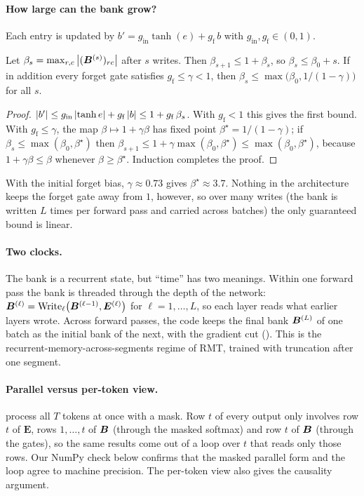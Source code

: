 \paragraph{How large can the bank grow?} Each entry is updated by
$b' = g_{\mathrm{in}}\tanh(e) + g_{\mathrm{f}}\, b$ with $g_{\mathrm{in}}, g_{\mathrm{f}} \in (0,1)$.
\begin{proposition}\label{prop:c10-lm2-bound}
Let $\beta_s = \max_{r,c} \left\lvert (\bm{B}^{(s)})_{rc}\right\rvert$ after $s$ writes. Then $\beta_{s+1} \le 1 +
\beta_s$, so $\beta_s \le \beta_0 + s$. If in addition every forget gate satisfies
$g_{\mathrm{f}} \le \gamma < 1$, then $\beta_s \le \max\bigl(\beta_0, 1/(1-\gamma)\bigr)$ for all $s$.
\end{proposition}
\begin{proof}
$\left\lvert b'\right\rvert \le g_{\mathrm{in}}\left\lvert \tanh e\right\rvert + g_{\mathrm{f}}\left\lvert b\right\rvert \le 1 + g_{\mathrm{f}}\,\beta_s$.
With $g_{\mathrm{f}} < 1$ this gives the first bound. With $g_{\mathrm{f}} \le \gamma$, the map
$\beta \mapsto 1 + \gamma\beta$ has fixed point $\beta^\star = 1/(1-\gamma)$; if $\beta_s \le
\max(\beta_0,\beta^\star)$ then $\beta_{s+1} \le 1 + \gamma\max(\beta_0,\beta^\star) \le
\max(\beta_0,\beta^\star)$, because $1 + \gamma\beta \le \beta$ whenever $\beta \ge \beta^\star$.
Induction completes the proof.
\end{proof}
With the initial forget bias, $\gamma \approx 0.73$ gives $\beta^\star \approx 3.7$. Nothing in the
architecture keeps the forget gate away from $1$, however, so over many writes (the bank is written
$L$ times per forward pass and carried across batches) the only guaranteed bound is linear.

\paragraph{Two clocks.} The bank is a recurrent state, but ``time'' has two meanings. Within one
forward pass the bank is threaded through the depth of the network:
$\bm{B}^{(\ell)} = \mathrm{Write}_\ell\bigl(\bm{B}^{(\ell-1)}, \bm{E}^{(\ell)}\bigr)$ for
$\ell = 1,\dots,L$, so each layer reads what earlier layers wrote. Across forward passes, the code
keeps the final bank $\bm{B}^{(L)}$ of one batch as the initial bank of the next, with the gradient
cut (). This is the recurrent-memory-across-segments regime of
RMT, trained with truncation after one segment.

\paragraph{Parallel versus per-token view.} 
process all $T$ tokens at once with a mask. Row $t$ of every output only involves row $t$ of
$\bm{E}$, rows $1,\dots,t$ of $\bm{B}$ (through the masked softmax) and row $t$ of $\bm{B}$ (through the
gates), so the same results come out of a loop over $t$ that reads only those rows. Our NumPy check
below confirms that the masked parallel form and the loop agree to machine precision. The
per-token view also gives the causality argument.

